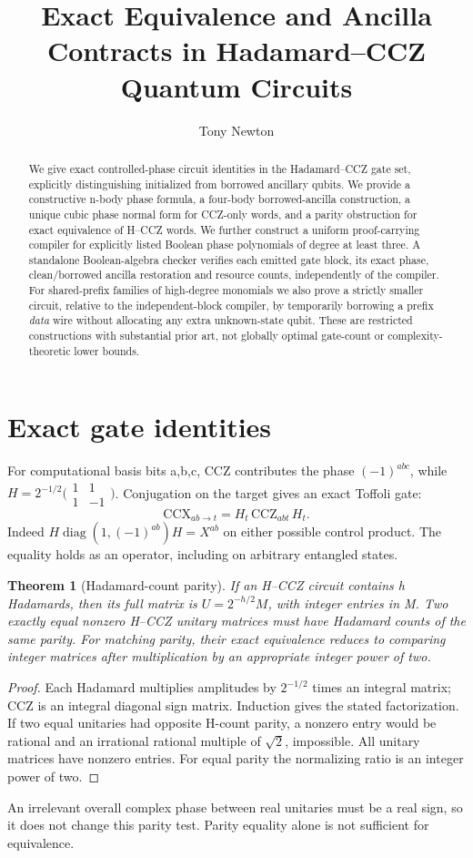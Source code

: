 \documentclass[11pt,a4paper]{article}
\title{Exact Equivalence and Ancilla Contracts in Hadamard--CCZ Quantum Circuits}
\author{Tony Newton}
\date{}
\newtheorem{theorem}{Theorem}
\begin{document}
\maketitle
\begin{abstract}
We give exact controlled-phase circuit identities in the Hadamard--CCZ gate set, explicitly distinguishing initialized from borrowed ancillary qubits. We provide a constructive n-body phase formula, a four-body borrowed-ancilla construction, a unique cubic phase normal form for CCZ-only words, and a parity obstruction for exact equivalence of H--CCZ words. We further construct a uniform proof-carrying compiler for explicitly listed Boolean phase polynomials of degree at least three. A standalone Boolean-algebra checker verifies each emitted gate block, its exact phase, clean/borrowed ancilla restoration and resource counts, independently of the compiler. For shared-prefix families of high-degree monomials we also prove a strictly smaller circuit, relative to the independent-block compiler, by temporarily borrowing a prefix \emph{data} wire without allocating any extra unknown-state qubit. These are restricted constructions with substantial prior art, not globally optimal gate-count or complexity-theoretic lower bounds.
\end{abstract}
\section{Exact gate identities}
For computational basis bits a,b,c, CCZ contributes the phase $(-1)^{abc}$, while $H=2^{-1/2}\bigl(\begin{smallmatrix}1&1\\1&-1\end{smallmatrix}\bigr)$.
Conjugation on the target gives an exact Toffoli gate:
\[
\mathrm{CCX}_{ab\to t}=H_t\,\mathrm{CCZ}_{abt}\,H_t.
\]
Indeed $H\operatorname{diag}(1,(-1)^{ab})H=X^{ab}$ on either possible control product. The equality holds as an operator, including on arbitrary entangled states.

\begin{theorem}[Hadamard-count parity]
If an H--CCZ circuit contains h Hadamards, then its full matrix is $U=2^{-h/2}M$, with integer entries in M. Two exactly equal nonzero H--CCZ unitary matrices must have Hadamard counts of the same parity. For matching parity, their exact equivalence reduces to comparing integer matrices after multiplication by an appropriate integer power of two.
\end{theorem}
\begin{proof}
Each Hadamard multiplies amplitudes by $2^{-1/2}$ times an integral matrix; CCZ is an integral diagonal sign matrix. Induction gives the stated factorization. If two equal unitaries had opposite H-count parity, a nonzero entry would be rational and an irrational rational multiple of $\sqrt2$, impossible. All unitary matrices have nonzero entries. For equal parity the normalizing ratio is an integer power of two.
\end{proof}
An irrelevant overall complex phase between real unitaries must be a real sign, so it does not change this parity test. Parity equality alone is not sufficient for equivalence.
\end{document}
